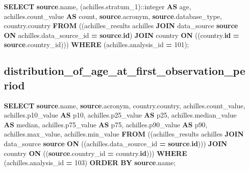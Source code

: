 \documentclass[
]{book}
\newenvironment{Shaded}{\begin{snugshade}}{\end{snugshade}}
\newcommand{\CharTok}[1]{\textcolor[rgb]{0.31,0.60,0.02}{#1}}
\newcommand{\DecValTok}[1]{\textcolor[rgb]{0.00,0.00,0.81}{#1}}
\newcommand{\FunctionTok}[1]{\textcolor[rgb]{0.00,0.00,0.00}{#1}}
\newcommand{\KeywordTok}[1]{\textcolor[rgb]{0.13,0.29,0.53}{\textbf{#1}}}
\newcommand{\NormalTok}[1]{#1}
\newcommand{\OperatorTok}[1]{\textcolor[rgb]{0.81,0.36,0.00}{\textbf{#1}}}
\begin{document}
\begin{Shaded}
\begin{Highlighting}[]
\KeywordTok{SELECT} \KeywordTok{source}\NormalTok{.name,}
\NormalTok{   (achilles.stratum\_1):}\CharTok{:integer} \KeywordTok{AS}\NormalTok{ age,}
\NormalTok{   achilles.count\_value }\KeywordTok{AS} \FunctionTok{count}\NormalTok{,}
   \KeywordTok{source}\NormalTok{.acronym,}
   \KeywordTok{source}\NormalTok{.database\_type,}
\NormalTok{   country.country}
  \KeywordTok{FROM}\NormalTok{ ((achilles\_results achilles}
    \KeywordTok{JOIN}\NormalTok{ data\_source }\KeywordTok{source}
      \KeywordTok{ON}\NormalTok{ achilles.data\_source\_id }\OperatorTok{=} \KeywordTok{source}\NormalTok{.}\KeywordTok{id}\NormalTok{)}
    \KeywordTok{JOIN}\NormalTok{ country }\KeywordTok{ON}\NormalTok{ ((country.}\KeywordTok{id} \OperatorTok{=} \KeywordTok{source}\NormalTok{.country\_id)))}
 \KeywordTok{WHERE}\NormalTok{ (achilles.analysis\_id }\OperatorTok{=} \DecValTok{101}\NormalTok{);}
\end{Highlighting}
\end{Shaded}

\hypertarget{distribution_of_age_at_first_observation_period}{%
\subsection*{distribution\_of\_age\_at\_first\_observation\_period}\label{distribution_of_age_at_first_observation_period}}

\begin{Shaded}
\begin{Highlighting}[]
\KeywordTok{SELECT} \KeywordTok{source}\NormalTok{.name,}
   \KeywordTok{source}\NormalTok{.acronym,}
\NormalTok{   country.country,}
\NormalTok{   achilles.count\_value,}
\NormalTok{   achilles.p10\_value }\KeywordTok{AS}\NormalTok{ p10,}
\NormalTok{   achilles.p25\_value }\KeywordTok{AS}\NormalTok{ p25,}
\NormalTok{   achilles.median\_value }\KeywordTok{AS} \FunctionTok{median}\NormalTok{,}
\NormalTok{   achilles.p75\_value }\KeywordTok{AS}\NormalTok{ p75,}
\NormalTok{   achilles.p90\_value }\KeywordTok{AS}\NormalTok{ p90,}
\NormalTok{   achilles.max\_value,}
\NormalTok{   achilles.min\_value}
  \KeywordTok{FROM}\NormalTok{ ((achilles\_results achilles}
    \KeywordTok{JOIN}\NormalTok{ data\_source }\KeywordTok{source}
      \KeywordTok{ON}\NormalTok{ ((achilles.data\_source\_id }\OperatorTok{=} \KeywordTok{source}\NormalTok{.}\KeywordTok{id}\NormalTok{)))}
    \KeywordTok{JOIN}\NormalTok{ country }\KeywordTok{ON}\NormalTok{ ((}\KeywordTok{source}\NormalTok{.country\_id }\OperatorTok{=}\NormalTok{ country.}\KeywordTok{id}\NormalTok{)))}
 \KeywordTok{WHERE}\NormalTok{ (achilles.analysis\_id }\OperatorTok{=} \DecValTok{103}\NormalTok{)}
 \KeywordTok{ORDER} \KeywordTok{BY} \KeywordTok{source}\NormalTok{.name;}
\end{Highlighting}
\end{Shaded}
\end{document}
